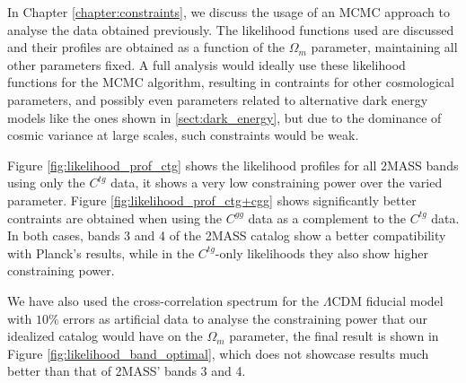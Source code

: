 \documentclass[openany,a4paper,12pt,oneside]{book}
\begin{document}
\begin{spacing}{1.5}
In Chapter \ref{chapter:constraints}, we discuss the usage of an MCMC approach to analyse the data obtained previously. The likelihood functions used are discussed and their profiles are obtained as a function of the $\Omega_m$ parameter, maintaining all other parameters fixed. A full analysis would ideally use these likelihood functions for the MCMC algorithm, resulting in contraints for other cosmological parameters, and possibly even parameters related to alternative dark energy models like the ones shown in \ref{sect:dark_energy}, but due to the dominance of cosmic variance at large scales, such constraints would be weak.

Figure \ref{fig:likelihood_prof_ctg} shows the likelihood profiles for all 2MASS bands using only the $C^{tg}$ data, it shows a very low constraining power over the varied parameter. Figure \ref{fig:likelihood_prof_ctg+cgg} shows significantly better contraints are obtained when using the $C^{gg}$ data as a complement to the $C^{tg}$ data. In both cases, bands 3 and 4 of the 2MASS catalog show a better compatibility with Planck's results, while in the $C^{tg}$-only likelihoods they also show higher constraining power.



We have also used the cross-correlation spectrum for the $\Lambda$CDM fiducial model with $10\%$ errors as artificial data to analyse the constraining power that our idealized catalog would have on the $\Omega_m$ parameter, the final result is shown in Figure \ref{fig:likelihood_band_optimal}, which does not showcase results much better than that of 2MASS' bands 3 and 4. 


\end{spacing}
\end{document}
